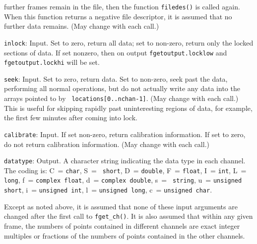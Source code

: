 \begin{description}
   further frames remain in the file, then the function {\tt filedes()} is
   called again.  When this function returns a negative file descriptor,
   it is assumed that no further data remains.  (May change with each
   call.)
\item{\tt inlock}: Input.  Set to zero, return all data; set to non-zero, return only the locked sections of data.  If set nonzero, then on output {\tt fgetoutput.locklow} and {\tt fgetoutput.lockhi} will be set.
\item{\tt seek}: Input.  Set to zero, return data.  Set to non-zero,
   seek past the data, performing all normal operations, but do
   not actually write any data into the arrays pointed to by {\tt
   locations[0..nchan-1]}.  (May change with each call.)  This is useful
   for skipping rapidly past uninteresting regions of data, for example,
   the first few minutes after coming into lock.
\item{\tt calibrate}: Input.  If set non-zero, return calibration information.  If set to zero, do not return
   calibration information. (May change with each call.)
\item{\tt datatype}: Output. A character string indicating the data
   type in each channel. The coding is: C~= {\tt char}, S~= {\tt
     short}, D~= {\tt double}, F~= {\tt float}, I~= {\tt int}, L~= {\tt
     long}, f~= {\tt complex float}, d~= {\tt complex double}, s~= {\tt
     string}, u~= {\tt unsigned short}, i~= {\tt unsigned int}, l~=
     {\tt unsigned long}, c~= {\tt unsigned char}.  
\end{description}
\noindent
Except as noted above, it is assumed that none of these input arguments
are changed after the first call to {\tt fget\_ch()}.  It is also
assumed that within any given frame, the numbers of points contained
in different channels are exact integer multiples or fractions of the
numbers of points contained in the other channels.

